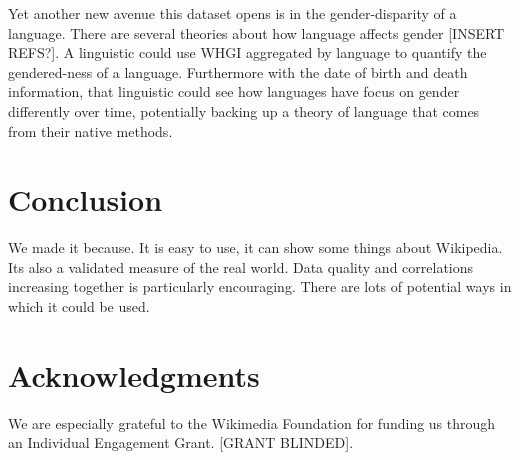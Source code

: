\documentclass[letterpaper]{article}
\begin{document}
Yet another new avenue this dataset opens is in the gender-disparity of a language. There are several theories about how language affects gender [INSERT REFS?]. A linguistic could use WHGI aggregated by language to quantify the gendered-ness of a language. Furthermore with the date of birth and death information, that linguistic could see how languages have focus on gender differently over time, potentially backing up a theory of language that comes from their native methods. 

\section{Conclusion}
We made it because. It is easy to use, it can show some things about Wikipedia. Its also a validated measure of the real world. Data quality and correlations increasing together is particularly encouraging. There are lots of potential ways in which it could be used.	


\section{ Acknowledgments}
We are especially grateful to the Wikimedia Foundation for funding us through an Individual Engagement Grant. [GRANT BLINDED].



\end{document}
